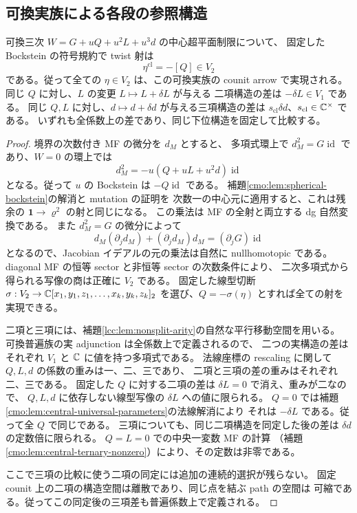 \subsection{可換実族による各段の参照構造}

\begin{lemma}[二次類の実現と低次係数の作用]
\label{lcc:lem:commutative-realization}
可換三次 $W=G+uQ+u^2L+u^3d$ の中心超平面制限について、
固定した Bockstein の符号規約で twist 射は
\[
               \eta^{\mathrm{cl}}=-[Q]\in V_2
\]
である。従って全ての $\eta\in V_2$ は、この可換実族の counit arrow で実現される。
同じ $Q$ に対し、$L$ の変更 $L\mapsto L+\delta L$ が与える
二項構造の差は $-\delta L\in V_1$ である。
同じ $Q,L$ に対し、$d\mapsto d+\delta d$ が与える三項構造の差は
$s_{\mathrm{cl}}\delta d$、$s_{\mathrm{cl}}\in\mathbb C^\times$ である。
いずれも全係数上の差であり、同じ下位構造を固定して比較する。
\end{lemma}

\begin{proof}
境界の次数付き MF の微分を $d_M$ とすると、
多項式環上で $d_M^2=G\operatorname{id}$ であり、$W=0$ の環上では
\[
 d_M^2=-u(Q+uL+u^2d)\operatorname{id}
\]
となる。従って $u$ の Bockstein は $-Q\operatorname{id}$ である。
補題\ref{cmo:lem:spherical-bockstein}の解消と mutation の証明を
次数一の中心元に適用すると、これは残余の
$\mathbf1\to\varrho^2$ の射と同じになる。
この乗法は MF の全射と両立する dg 自然変換である。
また $d_M^2=G$ の微分によって
\[
 d_M(\partial_jd_M)+(\partial_jd_M)d_M
                   =(\partial_jG)\operatorname{id}
\]
となるので、Jacobian イデアルの元の乗法は自然に nullhomotopic である。
diagonal MF の恒等 sector と非恒等 sector の次数条件により、
二次多項式から得られる写像の商は正確に $V_2$ である。
固定した線型切断 $\sigma:V_2\to\mathbb C[x_1,y_1,z_1,\ldots,x_k,y_k,z_k]_2$
を選び、$Q=-\sigma(\eta)$ とすれば全ての射を実現できる。

二項と三項には、補題\ref{lcc:lem:nonsplit-arity}の自然な平行移動空間を用いる。
可換普遍族の実 adjunction は全係数上で定義されるので、
二つの実構造の差はそれぞれ $V_1$ と $\mathbb C$ に値を持つ多項式である。
法線座標の rescaling に関して $Q,L,d$ の係数の重みは一、二、三であり、
二項と三項の差の重みはそれぞれ二、三である。
固定した $Q$ に対する二項の差は $\delta L=0$ で消え、重みが二なので、
$Q,L,d$ に依存しない線型写像の $\delta L$ への値に限られる。
$Q=0$ では補題\ref{cmo:lem:central-universal-parameters}の法線解消により
それは $-\delta L$ である。従って全 $Q$ で同じである。
三項についても、同じ二項構造を同定した後の差は
$\delta d$ の定数倍に限られる。
$Q=L=0$ での中央一変数 MF の計算
（補題\ref{cmo:lem:central-ternary-nonzero}）により、その定数は非零である。

ここで三項の比較に使う二項の同定には追加の連続的選択が残らない。
固定 counit 上の二項の構造空間は離散であり、同じ点を結ぶ path の空間は
可縮である。従ってこの同定後の三項差も普遍係数上で定義される。
\end{proof}


